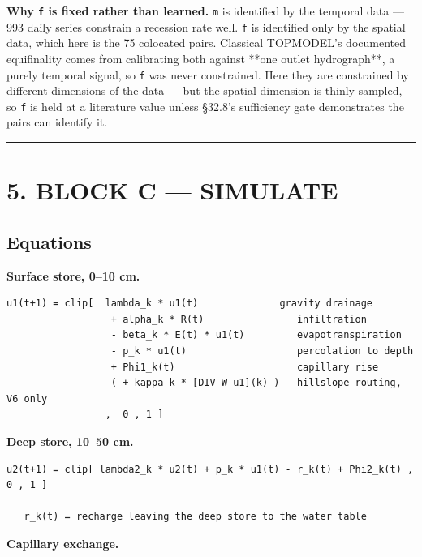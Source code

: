 \documentclass[10pt,a4paper]{article}
\begin{document}
\textbf{Why \texttt{f} is fixed rather than learned.} \texttt{m} is identified by the temporal data
— 993 daily series constrain a recession rate well. \texttt{f} is identified only by
the spatial data, which here is the 75 colocated pairs. Classical TOPMODEL's
documented equifinality comes from calibrating both against **one outlet
hydrograph**, a purely temporal signal, so \texttt{f} was never constrained. Here they
are constrained by different dimensions of the data — but the spatial dimension
is thinly sampled, so \texttt{f} is held at a literature value unless §32.8's
sufficiency gate demonstrates the pairs can identify it.

\medskip\hrule\medskip

\section*{5. BLOCK C — SIMULATE}

\subsection*{Equations}

\textbf{Surface store, 0–10 cm.}

\begin{Verbatim}[fontsize=\scriptsize,frame=leftline,framerule=0.6pt,rulecolor=\color{rulegray},xleftmargin=6pt,framesep=6pt,]
   u1(t+1) = clip[  lambda_k * u1(t)              gravity drainage
                  + alpha_k * R(t)                infiltration
                  - beta_k * E(t) * u1(t)         evapotranspiration
                  - p_k * u1(t)                   percolation to depth
                  + Phi1_k(t)                     capillary rise
                  ( + kappa_k * [DIV_W u1](k) )   hillslope routing, V6 only
                 ,  0 , 1 ]
\end{Verbatim}

\textbf{Deep store, 10–50 cm.}

\begin{Verbatim}[fontsize=\scriptsize,frame=leftline,framerule=0.6pt,rulecolor=\color{rulegray},xleftmargin=6pt,framesep=6pt,]
   u2(t+1) = clip[ lambda2_k * u2(t) + p_k * u1(t) - r_k(t) + Phi2_k(t) , 0 , 1 ]

   r_k(t) = recharge leaving the deep store to the water table
\end{Verbatim}

\textbf{Capillary exchange.}
\end{document}

